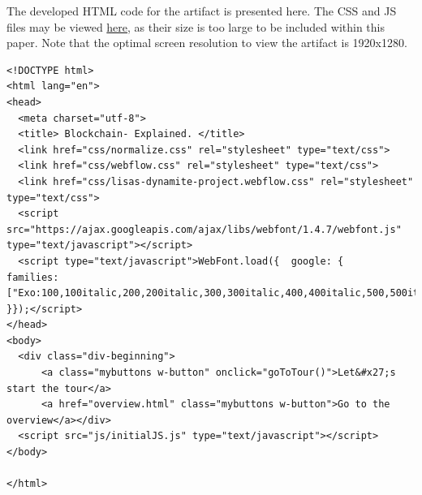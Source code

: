 \pagebreak

 \label{anhang:CodeArtifact}
The developed \ac{HTML} code for the artifact is presented here. The \ac{CSS} and \ac{JS} files may be viewed \href{https://drive.google.com/open?id=1VpSXRGKMNQqgWDcYHZFq5iGaC5cWwxXd}{here}, as their size is too large to be included within this paper. Note that the optimal screen resolution to view the artifact is 1920x1280.

\lstset{
language=HTML,
breaklines=true,
basicstyle=\footnotesize,
stepnumber=2,
}

\begin{lstlisting}
<!DOCTYPE html>
<html lang="en">
<head>
  <meta charset="utf-8">
  <title> Blockchain- Explained. </title>
  <link href="css/normalize.css" rel="stylesheet" type="text/css">
  <link href="css/webflow.css" rel="stylesheet" type="text/css">
  <link href="css/lisas-dynamite-project.webflow.css" rel="stylesheet" type="text/css">
  <script src="https://ajax.googleapis.com/ajax/libs/webfont/1.4.7/webfont.js" type="text/javascript"></script>
  <script type="text/javascript">WebFont.load({  google: {    families: ["Exo:100,100italic,200,200italic,300,300italic,400,400italic,500,500italic,600,600italic,700,700italic,800,800italic,900,900italic","Roboto:100,100italic,300,300italic,regular,italic,500,500italic,700,700italic,900,900italic"]  }});</script>
</head>
<body>
  <div class="div-beginning">
      <a class="mybuttons w-button" onclick="goToTour()">Let&#x27;s start the tour</a>
      <a href="overview.html" class="mybuttons w-button">Go to the overview</a></div>
  <script src="js/initialJS.js" type="text/javascript"></script>
</body>

</html>
\end{lstlisting}

